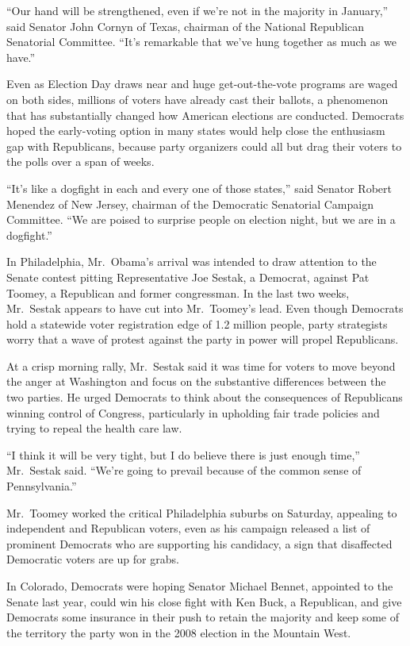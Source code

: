 ﻿\documentclass[12pt]{article}
\begin{document}
``Our hand will be strengthened, even if we're not in the majority in January,'' said Senator John
Cornyn of Texas, chairman of the National Republican Senatorial Committee. ``It's remarkable that
we've hung together as much as we have.''

Even as Election Day draws near and huge get-out-the-vote programs are waged on both sides, millions
of voters have already cast their ballots, a phenomenon that has substantially changed how American
elections are conducted. Democrats hoped the early-voting option in many states would help close the
enthusiasm gap with Republicans, because party organizers could all but drag their voters to the
polls over a span of weeks.

``It's like a dogfight in each and every one of those states,'' said Senator Robert Menendez of New
Jersey, chairman of the Democratic Senatorial Campaign Committee. ``We are poised to surprise people
on election night, but we are in a dogfight.''

In Philadelphia, Mr.~Obama's arrival was intended to draw attention to the Senate contest pitting
Representative Joe Sestak, a Democrat, against Pat Toomey, a Republican and former congressman. In
the last two weeks, Mr.~Sestak appears to have cut into Mr.~Toomey's lead. Even though Democrats
hold a statewide voter registration edge of 1.2 million people, party strategists worry that a wave
of protest against the party in power will propel Republicans.

At a crisp morning rally, Mr.~Sestak said it was time for voters to move beyond the anger at
Washington and focus on the substantive differences between the two parties. He urged Democrats to
think about the consequences of Republicans winning control of Congress, particularly in upholding
fair trade policies and trying to repeal the health care law.

``I think it will be very tight, but I do believe there is just enough time,'' Mr.~Sestak said.
``We're going to prevail because of the common sense of Pennsylvania.''

Mr.~Toomey worked the critical Philadelphia suburbs on Saturday, appealing to independent and
Republican voters, even as his campaign released a list of prominent Democrats who are supporting
his candidacy, a sign that disaffected Democratic voters are up for grabs.

In Colorado, Democrats were hoping Senator Michael Bennet, appointed to the Senate last year, could
win his close fight with Ken Buck, a Republican, and give Democrats some insurance in their push to
retain the majority and keep some of the territory the party won in the 2008 election in the
Mountain West.
\end{document}
